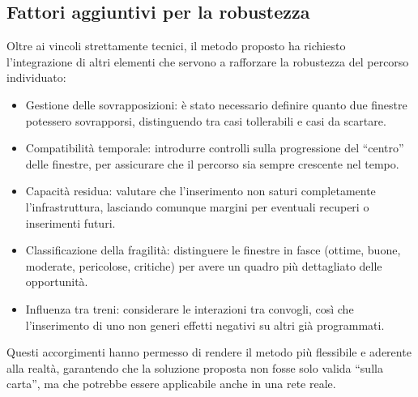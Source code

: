 \documentclass[a4paper,12pt]{report}
\begin{document}
 
 \subsection{Fattori aggiuntivi per la robustezza}
Oltre ai vincoli strettamente tecnici, il metodo proposto ha richiesto l’integrazione di altri elementi che servono a rafforzare la robustezza del percorso individuato:
\begin{itemize}
    \item Gestione delle sovrapposizioni: è stato necessario definire quanto due finestre potessero sovrapporsi, distinguendo tra casi tollerabili e casi da scartare.

   \item Compatibilità temporale: introdurre controlli sulla progressione del “centro” delle finestre, per assicurare che il percorso sia sempre crescente nel tempo.

  \item Capacità residua: valutare che l’inserimento non saturi completamente l’infrastruttura, lasciando comunque margini per eventuali recuperi o inserimenti futuri.

  \item Classificazione della fragilità: distinguere le finestre in fasce (ottime, buone, moderate, pericolose, critiche) per avere un quadro più dettagliato delle opportunità.

  \item Influenza tra treni: considerare le interazioni tra convogli, così che l’inserimento di uno non generi effetti negativi su altri già programmati.
  \end{itemize}
Questi accorgimenti hanno permesso di rendere il metodo più flessibile e aderente alla realtà, garantendo che la soluzione proposta non fosse solo valida “sulla carta”, ma che potrebbe essere applicabile anche in una rete reale.
\end{document}
